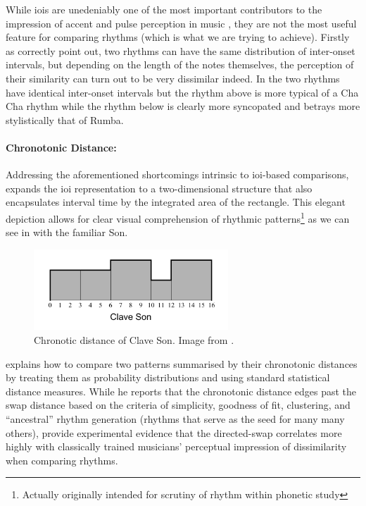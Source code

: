 While \acrshort{ioi}s are unedeniably one of the most important contributors to the impression of accent and pulse perception in music \citep{Parncutt1994}, they are not the most useful feature for comparing rhythms (which is what we are trying to achieve). Firstly as \cite{Dixon2004} correctly point out, two rhythms can have the same distribution of inter-onset intervals, but depending on the length of the notes themselves, the perception of their similarity can turn out to be very dissimilar indeed. In  the two rhythms have identical inter-onset intervals but the rhythm above is more typical of a Cha Cha rhythm while the rhythm below is clearly more syncopated and betrays more stylistically that of Rumba.


\paragraph{Chronotonic Distance:} 
Addressing the aforementioned shortcomings intrinsic to \acrshort{ioi}-based comparisons, \cite{gustafson1987new} expands the \acrshort{ioi} representation to a two-dimensional structure that also encapsulates interval time by the integrated area of the rectangle. This elegant depiction allows for clear visual comprehension of rhythmic patterns\footnote{Actually originally intended for scrutiny of rhythm within phonetic study} as we can see in  with the familiar Son. 

\begin{figure}
	\begin{center}
		\includegraphics[width=0.65\textwidth]{ch03_symbolic/figures/chronotonic.png}
	\end{center}
	\caption[Chronotic distance of Clave Son]{Chronotic distance of Clave Son. Image from \cite{Toussaint2004}.}
	\label{fig:chronotnic}
\end{figure}

\citep{Toussaint2004} explains how to compare two patterns summarised by their chronotonic distances by treating them as probability distributions and using standard statistical distance measures. While he reports that the chronotonic distance edges past the swap distance based on the criteria of simplicity, goodness of fit, clustering, and ``ancestral'' rhythm generation (rhythms that serve as the seed for many many others), \cite{Guastavino2008} provide experimental evidence that the directed-swap correlates more highly with classically trained musicians’ perceptual impression of dissimilarity when comparing rhythms.

